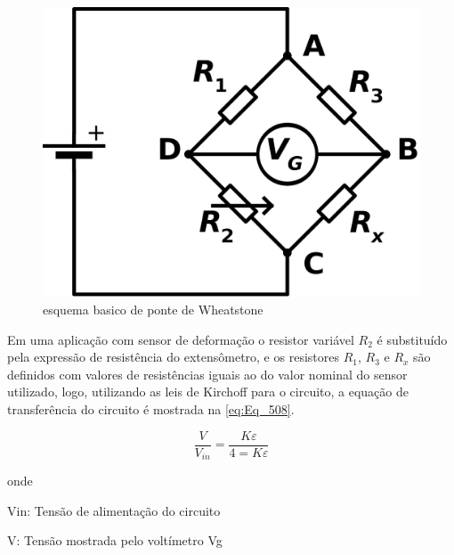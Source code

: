 \begin{figure}[htb]
	\caption{\label{fig:Fig_502}esquema basico de ponte de Wheatstone}
	\begin{center}
		\includegraphics[width=\textwidth]{images/img502.png}
	\end{center}
\end{figure}

Em uma aplicação com sensor de deformação o resistor variável $R_2$ é substituído pela expressão de resistência do extensômetro, e os resistores $R_1$, $R_3$ e $R_x$ são definidos com valores de resistências iguais ao do valor nominal do sensor utilizado, logo, utilizando as leis de Kirchoff para o circuito, a equação de transferência do circuito é mostrada na \autoref{eq:Eq_508}.

\begin{equation}\label{eq:Eq_508}
\frac{V}{V_{in}} = \frac{K \varepsilon}{4 = K \varepsilon}
\end{equation}

onde

Vin: Tensão de alimentação do circuito

V: Tensão mostrada pelo voltímetro Vg


